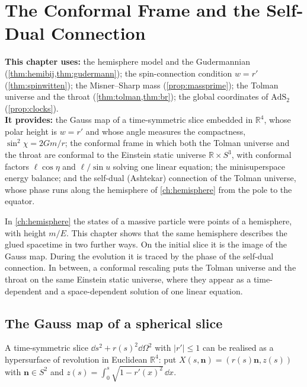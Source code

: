 \chapter{The Conformal Frame and the Self-Dual Connection}
\label{ch:conformal}

\begin{usesbox}
\textbf{This chapter uses:} the hemisphere model and the Gudermannian (\cref{thm:hemibij,thm:gudermann}); the spin-connection condition $w=r'$ (\cref{thm:spinwitten}); the Misner--Sharp mass (\cref{prop:massprime}); the Tolman universe and the throat (\cref{thm:tolman,thm:br}); the global coordinates of $\mathrm{AdS}_2$ (\cref{prop:clocks}).\\
\textbf{It provides:} the Gauss map of a time-symmetric slice embedded in $\mathbb R^4$, whose polar height is $w=r'$ and whose angle measures the compactness, $\sin^2\chi=2Gm/r$; the conformal frame in which both the Tolman universe and the throat are conformal to the Einstein static universe $\mathbb R\times S^3$, with conformal factors $\ell\cos\eta$ and $\ell/\sin u$ solving one linear equation; the minisuperspace energy balance; and the self-dual (Ashtekar) connection of the Tolman universe, whose phase runs along the hemisphere of \cref{ch:hemisphere} from the pole to the equator.
\end{usesbox}

In \cref{ch:hemisphere} the states of a massive particle were points of a hemisphere, with height $m/E$. This chapter shows that the same hemisphere describes the glued spacetime in two further ways. On the initial slice it is the image of the Gauss map. During the evolution it is traced by the phase of the self-dual connection. In between, a conformal rescaling puts the Tolman universe and the throat on the same Einstein static universe, where they appear as a time-dependent and a space-dependent solution of one linear equation.

\section{The Gauss map of a spherical slice}

A time-symmetric slice $\dd s^2+r(s)^2\dd\Omega^2$ with $|r'|\le1$ can be realised as a hypersurface of revolution in Euclidean $\mathbb R^4$: put $X(s,\mathbf n)=(r(s)\mathbf n,z(s))$ with $\mathbf n\in S^2$ and $z(s)=\int_0^s\sqrt{1-r'(x)^2}\,\dd x$.

